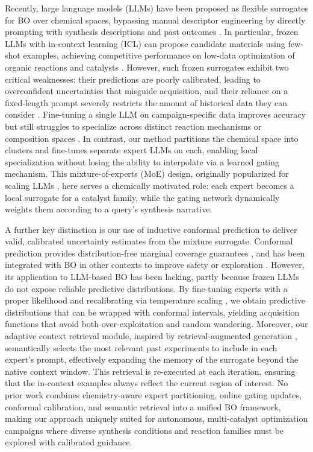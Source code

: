 \documentclass{article}
\begin{document}
Recently, large language models (LLMs) have been proposed as flexible surrogates for BO over chemical spaces, bypassing manual descriptor engineering by directly prompting with synthesis descriptions and past outcomes \cite{jablonka2024leveraging, bo_icl2023}. In particular, frozen LLMs with in-context learning (ICL) can propose candidate materials using few-shot examples, achieving competitive performance on low-data optimization of organic reactions and catalysts \cite{ramos2023chemcrow}. However, such frozen surrogates exhibit two critical weaknesses: their predictions are poorly calibrated, leading to overconfident uncertainties that misguide acquisition, and their reliance on a fixed-length prompt severely restricts the amount of historical data they can consider \cite{yang2023rethinking}. Fine-tuning a single LLM on campaign-specific data improves accuracy but still struggles to specialize across distinct reaction mechanisms or composition spaces \cite{xie2023finetuning}. In contrast, our method partitions the chemical space into clusters and fine-tunes separate expert LLMs on each, enabling local specialization without losing the ability to interpolate via a learned gating mechanism. This mixture-of-experts (MoE) design, originally popularized for scaling LLMs \cite{shazeer2017outrageously, fedus2022switch}, here serves a chemically motivated role: each expert becomes a local surrogate for a catalyst family, while the gating network dynamically weights them according to a query's synthesis narrative.

A further key distinction is our use of inductive conformal prediction to deliver valid, calibrated uncertainty estimates from the mixture surrogate. Conformal prediction provides distribution-free marginal coverage guarantees \cite{vovk2005algorithmic, angelopoulos2023gentle}, and has been integrated with BO in other contexts to improve safety or exploration \cite{stanton2023conformal, fannjiang2022conformal}. However, its application to LLM-based BO has been lacking, partly because frozen LLMs do not expose reliable predictive distributions. By fine-tuning experts with a proper likelihood and recalibrating via temperature scaling \cite{guo2017calibration}, we obtain predictive distributions that can be wrapped with conformal intervals, yielding acquisition functions that avoid both over-exploitation and random wandering. Moreover, our adaptive context retrieval module, inspired by retrieval-augmented generation \cite{lewis2020rag, guu2020realm}, semantically selects the most relevant past experiments to include in each expert’s prompt, effectively expanding the memory of the surrogate beyond the native context window. This retrieval is re-executed at each iteration, ensuring that the in-context examples always reflect the current region of interest. No prior work combines chemistry-aware expert partitioning, online gating updates, conformal calibration, and semantic retrieval into a unified BO framework, making our approach uniquely suited for autonomous, multi-catalyst optimization campaigns where diverse synthesis conditions and reaction families must be explored with calibrated guidance.
\end{document}
